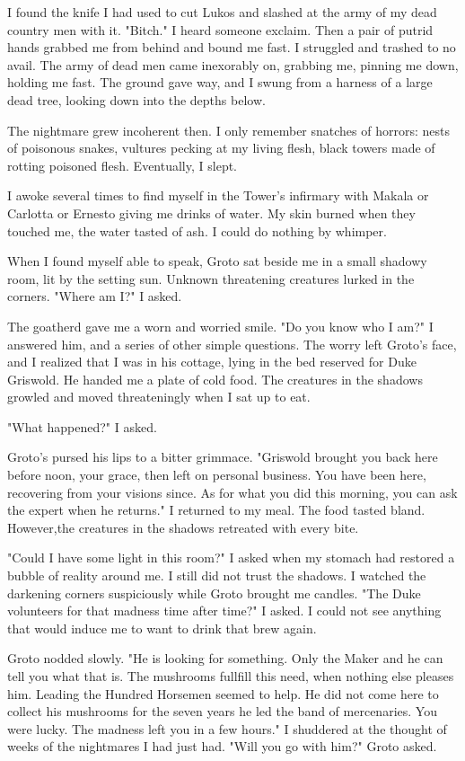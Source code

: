 \documentclass{article}
\begin{document}
I found the knife I had used to cut Lukos and slashed at the army of my dead country men with it. "Bitch." I heard someone exclaim. Then a pair of putrid hands grabbed me from behind and bound me fast. I struggled and trashed to no avail. The army of dead men came inexorably on, grabbing me, pinning me down, holding me fast. The ground gave way, and I swung from a harness of a large dead tree, looking down into the depths below. 

The nightmare grew incoherent then. I only remember snatches of horrors: nests of poisonous snakes, vultures pecking at my living flesh, black towers made of rotting poisoned flesh. Eventually, I slept. 
 
I awoke several times to find myself in the Tower's infirmary with Makala or Carlotta or Ernesto giving me drinks of water. My skin burned when they touched me, the water tasted of ash. I could do nothing by whimper.

When I found myself able to speak, Groto sat beside me in a small shadowy room, lit by the setting sun. Unknown threatening creatures lurked in the corners. "Where am I?" I asked.

The goatherd gave me a worn and worried smile. "Do you know who I am?" I answered him, and a series of other simple questions. The worry left Groto's face, and I realized that I was in his cottage, lying in the bed reserved for Duke Griswold. He handed me a plate of cold food. The creatures in the shadows growled and moved threateningly when I sat up to eat. 

"What happened?" I asked. 

Groto's pursed his lips to a bitter grimmace. "Griswold brought you back here before noon, your grace, then left on personal business. You have been here, recovering from your visions since. As for what you did this morning, you can ask the expert when he returns." I returned to my meal. The food tasted bland. However,the creatures in the shadows retreated with every bite. 

"Could I have some light in this room?" I asked when my stomach had restored a bubble of reality around me. I still did not trust the shadows. I watched the darkening corners suspiciously while Groto brought me candles. "The Duke volunteers for that madness time after time?" I asked. I could not see anything that would induce me to want to drink that brew again.

Groto nodded slowly. "He is looking for something. Only the Maker and he can tell you what that is. The mushrooms fullfill this need, when nothing else pleases him. Leading the Hundred Horsemen seemed to help. He did not come here to collect his mushrooms for the seven years he led the band of mercenaries. You were lucky. The madness left you in a few hours." I shuddered at the thought of weeks of the nightmares I had just had. "Will you go with him?" Groto asked. 
\end{document}
